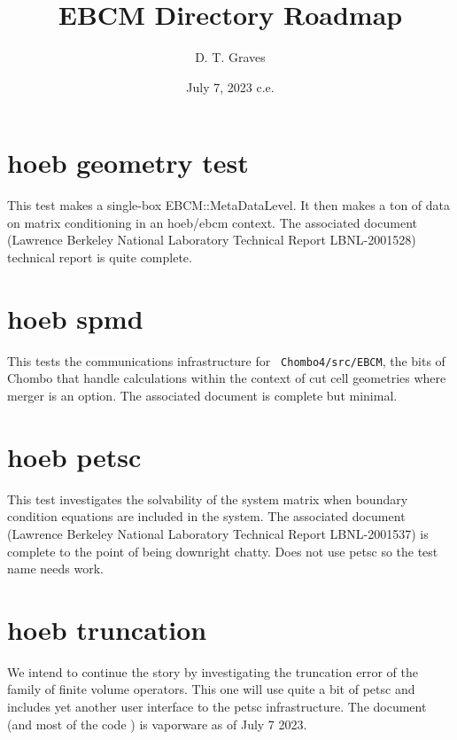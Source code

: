 \documentclass{article}
\begin{document}
\title{EBCM Directory Roadmap}
\author{ D. T. Graves }
\date{July 7, 2023 c.e.}
\maketitle

\section{hoeb geometry test}

This test makes a single-box EBCM::MetaDataLevel.  It then makes a ton
of data on matrix conditioning in an hoeb/ebcm context.    The
associated document (Lawrence Berkeley National Laboratory
Technical Report LBNL-2001528)
technical report is quite complete.   

\section{hoeb spmd}

This tests the communications infrastructure for {\tt
Chombo4/src/EBCM}, the bits of Chombo that handle calculations
within the context of  cut cell geometries where merger is an option.
The associated document is complete but minimal.


\section{hoeb petsc}

This test investigates the solvability of the system matrix when
boundary condition equations are included in the system.
The associated document
(Lawrence Berkeley National Laboratory
Technical Report LBNL-2001537)
is complete to the point of being downright
chatty. Does not use petsc so the test name needs work.

\section{hoeb truncation}

We intend to continue the story by investigating the truncation error of
the family of finite volume operators.   This one will use quite a bit
of petsc and includes yet another user interface to the petsc
infrastructure.   The document (and most of the code )
is vaporware as of July 7 2023.
\end{document}

